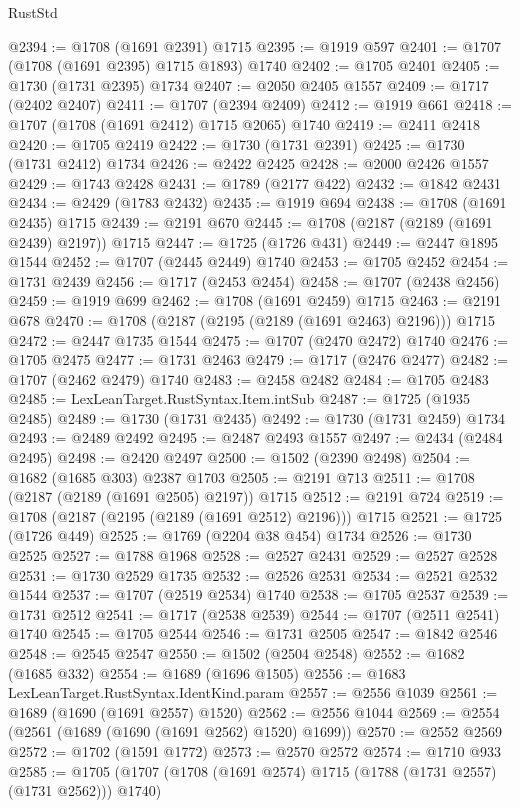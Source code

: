 \begin{lexlean}{RustStd}
\begin{coremodule}
@2394 := @1708 (@1691 @2391) @1715
@2395 := @1919 @597
@2401 := @1707 (@1708 (@1691 @2395) @1715 @1893) @1740
@2402 := @1705 @2401
@2405 := @1730 (@1731 @2395) @1734
@2407 := @2050 @2405 @1557
@2409 := @1717 (@2402 @2407)
@2411 := @1707 (@2394 @2409)
@2412 := @1919 @661
@2418 := @1707 (@1708 (@1691 @2412) @1715 @2065) @1740
@2419 := @2411 @2418
@2420 := @1705 @2419
@2422 := @1730 (@1731 @2391)
@2425 := @1730 (@1731 @2412) @1734
@2426 := @2422 @2425
@2428 := @2000 @2426 @1557
@2429 := @1743 @2428
@2431 := @1789 (@2177 @422)
@2432 := @1842 @2431
@2434 := @2429 (@1783 @2432)
@2435 := @1919 @694
@2438 := @1708 (@1691 @2435) @1715
@2439 := @2191 @670
@2445 := @1708 (@2187 (@2189 (@1691 @2439) @2197)) @1715
@2447 := @1725 (@1726 @431)
@2449 := @2447 @1895 @1544
@2452 := @1707 (@2445 @2449) @1740
@2453 := @1705 @2452
@2454 := @1731 @2439
@2456 := @1717 (@2453 @2454)
@2458 := @1707 (@2438 @2456)
@2459 := @1919 @699
@2462 := @1708 (@1691 @2459) @1715
@2463 := @2191 @678
@2470 := @1708 (@2187 (@2195 (@2189 (@1691 @2463) @2196))) @1715
@2472 := @2447 @1735 @1544
@2475 := @1707 (@2470 @2472) @1740
@2476 := @1705 @2475
@2477 := @1731 @2463
@2479 := @1717 (@2476 @2477)
@2482 := @1707 (@2462 @2479) @1740
@2483 := @2458 @2482
@2484 := @1705 @2483
@2485 := LexLeanTarget.RustSyntax.Item.intSub
@2487 := @1725 (@1935 @2485)
@2489 := @1730 (@1731 @2435)
@2492 := @1730 (@1731 @2459) @1734
@2493 := @2489 @2492
@2495 := @2487 @2493 @1557
@2497 := @2434 (@2484 @2495)
@2498 := @2420 @2497
@2500 := @1502 (@2390 @2498)
@2504 := @1682 (@1685 @303) @2387 @1703
@2505 := @2191 @713
@2511 := @1708 (@2187 (@2189 (@1691 @2505) @2197)) @1715
@2512 := @2191 @724
@2519 := @1708 (@2187 (@2195 (@2189 (@1691 @2512) @2196))) @1715
@2521 := @1725 (@1726 @449)
@2525 := @1769 (@2204 @38 @454) @1734
@2526 := @1730 @2525
@2527 := @1788 @1968
@2528 := @2527 @2431
@2529 := @2527 @2528
@2531 := @1730 @2529 @1735
@2532 := @2526 @2531
@2534 := @2521 @2532 @1544
@2537 := @1707 (@2519 @2534) @1740
@2538 := @1705 @2537
@2539 := @1731 @2512
@2541 := @1717 (@2538 @2539)
@2544 := @1707 (@2511 @2541) @1740
@2545 := @1705 @2544
@2546 := @1731 @2505
@2547 := @1842 @2546
@2548 := @2545 @2547
@2550 := @1502 (@2504 @2548)
@2552 := @1682 (@1685 @332)
@2554 := @1689 (@1696 @1505)
@2556 := @1683 LexLeanTarget.RustSyntax.IdentKind.param
@2557 := @2556 @1039
@2561 := @1689 (@1690 (@1691 @2557) @1520)
@2562 := @2556 @1044
@2569 := @2554 (@2561 (@1689 (@1690 (@1691 @2562) @1520) @1699))
@2570 := @2552 @2569
@2572 := @1702 (@1591 @1772)
@2573 := @2570 @2572
@2574 := @1710 @933
@2585 := @1705 (@1707 (@1708 (@1691 @2574) @1715 (@1788 (@1731 @2557) (@1731 @2562))) @1740)

\end{coremodule}
\end{lexlean}
